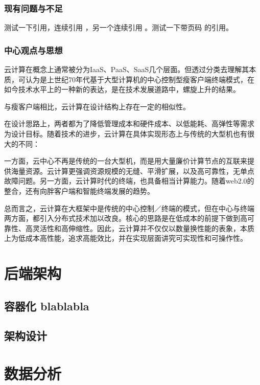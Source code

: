 \documentclass[master,winfonts]{jnuthesis}
\begin{document}
\subsection{现有问题与不足}

测试一下引用\cite{newman2006structure}，连续引用
\cite{newman2001random,aiello2000random,bollobas2001random}，另一个连续引用
\cite{newman2001random,bollobas2001random,barabasi1999emergence}。测试一下带页码
的引用\cite[124--128]{erdHos1961strength}。

\subsection{中心观点与思想}

云计算在概念上通常被分为IaaS、PaaS、SaaS几个层面。但透过分类去理解其本
质，可认为是上世纪70年代基于大型计算机的中心控制型瘦客户端终端模式，在
如今技术水平上的一种新的表达，是在技术发展道路中，螺旋上升的结果。

与瘦客户端相比，云计算在设计结构上存在一定的相似性。

在设计思路上，两者都为了降低管理成本和硬件成本、以低能耗、高弹性等需求
为设计目标。随着技术的进步，云计算在具体实现形态上与传统的大型机也有很
大的不同：

一方面，云中心不再是传统的一台大型机，而是用大量廉价计算节点的互联来提
供海量资源。云计算更强调资源规模的无缝、平滑扩展，以及高可靠性，无单点
故障问题。另一方面，云计算时代的终端，也具备相当计算能力。随着web2.0的
整合，还有向胖客户端和智能终端发展的趋势。

总而言之，云计算在大框架中是传统的中心控制／终端的模式，但在中心与终端
两方面，都引入分布式技术加以改良。核心的思路是在低成本的前提下做到高可
靠性、高灵活性和高伸缩性。因此，云计算并不仅仅以数量换性能的表象，本质
上为低成本高性能，追求高能效比，并在实现层面讲究可实现性和可操作性。

\chapter{后端架构}
\section{容器化 blablabla}
\Blindtext

\section{架构设计}
\Blindtext

\chapter{数据分析}
\end{document}
